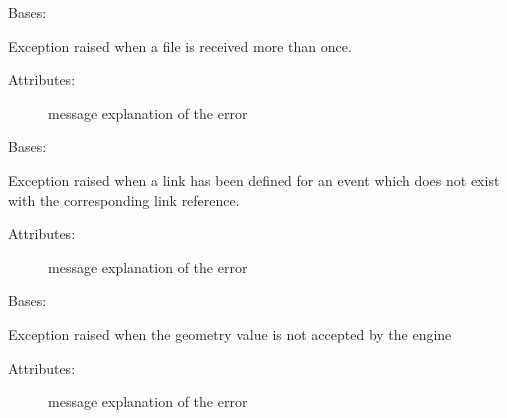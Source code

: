 
\begin{fulllineitems}
\label{\detokenize{eboa.engine:eboa.engine.errors.SourceAlreadyIngested}}
Bases: {\hyperref[\detokenize{eboa.engine:eboa.engine.errors.Error}]{}}

Exception raised when a file is received more than once.
\begin{description}
\item[{Attributes:}] \leavevmode
message \textendash{} explanation of the error

\end{description}

\end{fulllineitems}


\begin{fulllineitems}
\label{\detokenize{eboa.engine:eboa.engine.errors.UndefinedEventLink}}
Bases: {\hyperref[\detokenize{eboa.engine:eboa.engine.errors.Error}]{}}

Exception raised when a link has been defined for an event which does not exist with the corresponding link reference.
\begin{description}
\item[{Attributes:}] \leavevmode
message \textendash{} explanation of the error

\end{description}

\end{fulllineitems}


\begin{fulllineitems}
\label{\detokenize{eboa.engine:eboa.engine.errors.WrongGeometry}}
Bases: {\hyperref[\detokenize{eboa.engine:eboa.engine.errors.Error}]{}}

Exception raised when the geometry value is not accepted by the engine
\begin{description}
\item[{Attributes:}] \leavevmode
message \textendash{} explanation of the error

\end{description}

\end{fulllineitems}

